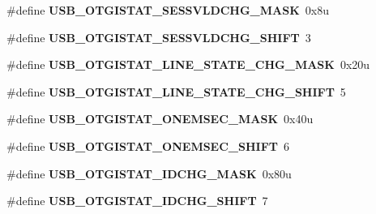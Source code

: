 \begin{DoxyCompactItemize}
\item 
\#define {\bfseries U\+S\+B\+\_\+\+O\+T\+G\+I\+S\+T\+A\+T\+\_\+\+S\+E\+S\+S\+V\+L\+D\+C\+H\+G\+\_\+\+M\+A\+SK}~0x8u\hypertarget{group__USB__Register__Masks_ga859962123dc28f346bafc99263efb811}{}\label{group__USB__Register__Masks_ga859962123dc28f346bafc99263efb811}

\item 
\#define {\bfseries U\+S\+B\+\_\+\+O\+T\+G\+I\+S\+T\+A\+T\+\_\+\+S\+E\+S\+S\+V\+L\+D\+C\+H\+G\+\_\+\+S\+H\+I\+FT}~3\hypertarget{group__USB__Register__Masks_gabcccd593607e1118c8283f20c69d7512}{}\label{group__USB__Register__Masks_gabcccd593607e1118c8283f20c69d7512}

\item 
\#define {\bfseries U\+S\+B\+\_\+\+O\+T\+G\+I\+S\+T\+A\+T\+\_\+\+L\+I\+N\+E\+\_\+\+S\+T\+A\+T\+E\+\_\+\+C\+H\+G\+\_\+\+M\+A\+SK}~0x20u\hypertarget{group__USB__Register__Masks_ga596dfbf3a2a0a6e6dcb1885ef11b4f8f}{}\label{group__USB__Register__Masks_ga596dfbf3a2a0a6e6dcb1885ef11b4f8f}

\item 
\#define {\bfseries U\+S\+B\+\_\+\+O\+T\+G\+I\+S\+T\+A\+T\+\_\+\+L\+I\+N\+E\+\_\+\+S\+T\+A\+T\+E\+\_\+\+C\+H\+G\+\_\+\+S\+H\+I\+FT}~5\hypertarget{group__USB__Register__Masks_ga7cb2076a9bf32a49fdbc7efcfc5fb8bb}{}\label{group__USB__Register__Masks_ga7cb2076a9bf32a49fdbc7efcfc5fb8bb}

\item 
\#define {\bfseries U\+S\+B\+\_\+\+O\+T\+G\+I\+S\+T\+A\+T\+\_\+\+O\+N\+E\+M\+S\+E\+C\+\_\+\+M\+A\+SK}~0x40u\hypertarget{group__USB__Register__Masks_gaa59b13f2f60173eaf2844dd089a6b31a}{}\label{group__USB__Register__Masks_gaa59b13f2f60173eaf2844dd089a6b31a}

\item 
\#define {\bfseries U\+S\+B\+\_\+\+O\+T\+G\+I\+S\+T\+A\+T\+\_\+\+O\+N\+E\+M\+S\+E\+C\+\_\+\+S\+H\+I\+FT}~6\hypertarget{group__USB__Register__Masks_ga561173eac45ee89d7447416da7747ec2}{}\label{group__USB__Register__Masks_ga561173eac45ee89d7447416da7747ec2}

\item 
\#define {\bfseries U\+S\+B\+\_\+\+O\+T\+G\+I\+S\+T\+A\+T\+\_\+\+I\+D\+C\+H\+G\+\_\+\+M\+A\+SK}~0x80u\hypertarget{group__USB__Register__Masks_ga853101783769b0e8f1c68dc63ed5dbbc}{}\label{group__USB__Register__Masks_ga853101783769b0e8f1c68dc63ed5dbbc}

\item 
\#define {\bfseries U\+S\+B\+\_\+\+O\+T\+G\+I\+S\+T\+A\+T\+\_\+\+I\+D\+C\+H\+G\+\_\+\+S\+H\+I\+FT}~7\hypertarget{group__USB__Register__Masks_gac273f68643eb40324f598cb4a275b87b}{}\label{group__USB__Register__Masks_gac273f68643eb40324f598cb4a275b87b}


\end{DoxyCompactItemize}
